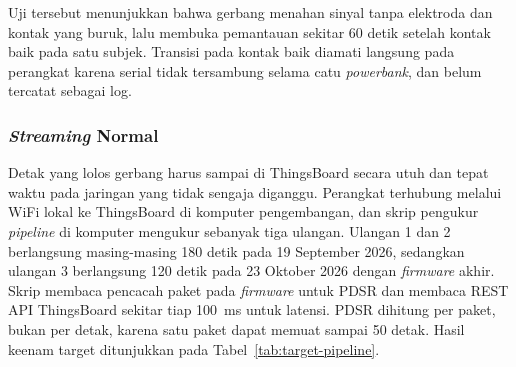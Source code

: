 Uji tersebut menunjukkan bahwa gerbang menahan sinyal tanpa elektroda dan kontak yang buruk, lalu membuka pemantauan sekitar 60 detik setelah kontak baik pada satu subjek. Transisi pada kontak baik diamati langsung pada perangkat karena serial tidak tersambung selama catu \textit{powerbank}, dan belum tercatat sebagai log.

\subsubsection{\textit{Streaming} Normal}

Detak yang lolos gerbang harus sampai di ThingsBoard secara utuh dan tepat waktu pada jaringan yang tidak sengaja diganggu. Perangkat terhubung melalui WiFi lokal ke ThingsBoard di komputer pengembangan, dan skrip pengukur \textit{pipeline} di komputer mengukur sebanyak tiga ulangan. Ulangan 1 dan 2 berlangsung masing-masing 180 detik pada 19 September 2026, sedangkan ulangan 3 berlangsung 120 detik pada 23 Oktober 2026 dengan \textit{firmware} akhir. Skrip membaca pencacah paket pada \textit{firmware} untuk PDSR dan membaca REST API ThingsBoard sekitar tiap 100~ms untuk latensi. PDSR dihitung per paket, bukan per detak, karena satu paket dapat memuat sampai 50 detak. Hasil keenam target ditunjukkan pada Tabel~\ref{tab:target-pipeline}.

